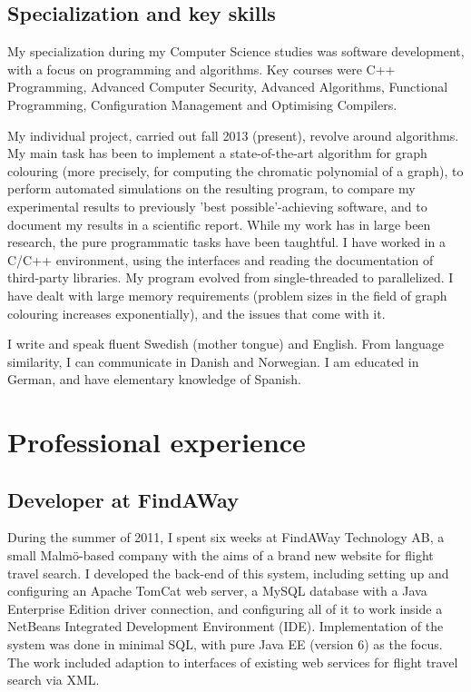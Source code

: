 \documentclass[a4paper]{article}
\begin{document}
\subsection*{Specialization and key skills}
My specialization during my Computer Science studies was software development, with a focus on programming and algorithms. Key courses were C++ Programming, Advanced Computer Security, Advanced Algorithms, Functional Programming, Configuration Management and Optimising Compilers.

My individual project, carried out fall 2013 (present), revolve around algorithms. My main task has been to implement a state-of-the-art algorithm for graph colouring (more precisely, for computing the chromatic polynomial of a graph), to perform automated simulations on the resulting program, to compare my experimental results to previously 'best possible'-achieving software, and to document my results in a scientific report. While my work has in large been research, the pure programmatic tasks have been taughtful. I have worked in a C/C++ environment, using the interfaces and reading the documentation of third-party libraries. My program evolved from single-threaded to parallelized. I have dealt with large memory requirements (problem sizes in the field of graph colouring increases exponentially), and the issues that come with it.

I write and speak fluent Swedish (mother tongue) and English. From language similarity, I can communicate in Danish and Norwegian. I am educated in German, and have elementary knowledge of Spanish.

\section*{Professional experience}

\subsection*{Developer at FindAWay}
During the summer of 2011, I spent six weeks at FindAWay Technology AB, a small Malmö-based company with the aims of a brand new website for flight travel search. I developed the back-end of this system, including setting up and configuring an Apache TomCat web server, a MySQL database with a Java Enterprise Edition driver connection, and configuring all of it to work inside a NetBeans Integrated Development Environment (IDE). Implementation of the system was done in minimal SQL, with pure Java EE (version 6) as the focus. The work included adaption to interfaces of existing web services for flight travel search via XML.
\end{document}
